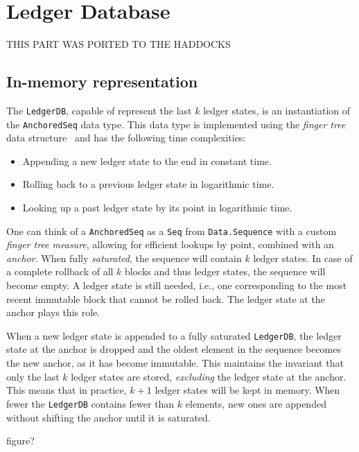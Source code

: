 \chapter{Ledger Database}
\label{ledgerdb}


THIS PART WAS PORTED TO THE HADDOCKS

\section{In-memory representation}
\label{ledgerdb:in-memory}

The \lstinline!LedgerDB!, capable of represent the last $k$ ledger states, is an
instantiation of the \lstinline!AnchoredSeq! data type. This data type is
implemented using the \emph{finger tree} data structure~\cite{fingertrees} and
has the following time complexities:

\begin{itemize}
\item Appending a new ledger state to the end in constant time.
\item Rolling back to a previous ledger state in logarithmic time.
\item Looking up a past ledger state by its point in logarithmic time.
\end{itemize}

One can think of a \lstinline!AnchoredSeq! as a \lstinline!Seq! from
\lstinline!Data.Sequence! with a custom \emph{finger tree measure}, allowing for
efficient lookups by point, combined with an \emph{anchor}. When fully
\emph{saturated}, the sequence will contain $k$ ledger states. In case of a
complete rollback of all $k$ blocks and thus ledger states, the sequence will
become empty. A ledger state is still needed, i.e., one corresponding to the
most recent immutable block that cannot be rolled back. The ledger state at the
anchor plays this role.

When a new ledger state is appended to a fully saturated \lstinline!LedgerDB!,
the ledger state at the anchor is dropped and the oldest element in the sequence
becomes the new anchor, as it has become immutable. This maintains the invariant
that only the last $k$ ledger states are stored, \emph{excluding} the ledger
state at the anchor. This means that in practice, $k + 1$ ledger states will be
kept in memory. When fewer the \lstinline!LedgerDB! contains fewer than $k$
elements, new ones are appended without shifting the anchor until it is
saturated.

 figure?

